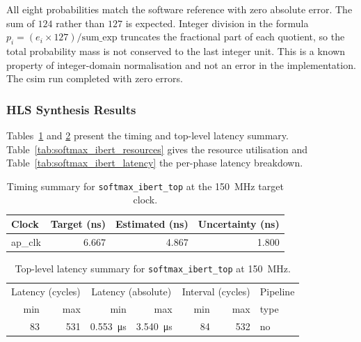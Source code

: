 All eight probabilities match the software reference with zero absolute error.
The sum of $124$ rather than $127$ is expected. Integer division in the
formula $p_i = (e_i \times 127) / \text{sum\_exp}$ truncates the fractional
part of each quotient, so the total probability mass is not conserved to the
last integer unit. This is a known property of integer-domain normalisation
and not an error in the implementation. The csim run completed with zero
errors.

\subsubsection{HLS Synthesis Results}
\label{subsubsec:softmax_ibert_csyn}

Tables~\ref{tab:softmax_ibert_timing} and \ref{tab:softmax_ibert_top_latency}
present the timing and top-level latency summary. Table~\ref{tab:softmax_ibert_resources}
gives the resource utilisation and Table~\ref{tab:softmax_ibert_latency} the
per-phase latency breakdown.

\begin{table}[H]
  \centering
  \begin{tabular}{lrrr}
    \toprule
    Clock & Target (ns) & Estimated (ns) & Uncertainty (ns) \\
    \midrule
    ap\_clk & 6.667 & 4.867 & 1.800 \\
    \bottomrule
  \end{tabular}
  \caption{Timing summary for \texttt{softmax\_ibert\_top} at the
           \SI{150}{\mega\hertz} target clock.}
  \label{tab:softmax_ibert_timing}
\end{table}

\begin{table}[H]
  \centering
  \begin{tabular}{rrrrrrl}
    \toprule
    \multicolumn{2}{c}{Latency (cycles)} &
    \multicolumn{2}{c}{Latency (absolute)} &
    \multicolumn{2}{c}{Interval (cycles)} & Pipeline \\
    min & max & min & max & min & max & type \\
    \midrule
    83 & 531 & \SI{0.553}{\micro\second} & \SI{3.540}{\micro\second} & 84 & 532 & no \\
    \bottomrule
  \end{tabular}
  \caption{Top-level latency summary for \texttt{softmax\_ibert\_top} at
           \SI{150}{\mega\hertz}.}
  \label{tab:softmax_ibert_top_latency}
\end{table}

